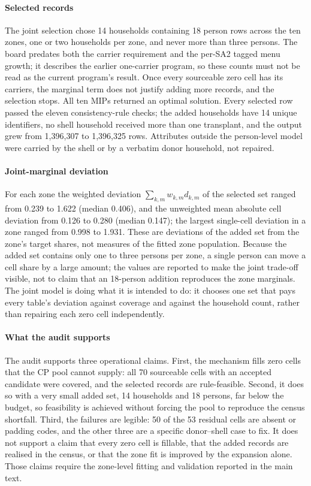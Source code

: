 \paragraph{Selected records}
The joint selection chose 14 households containing 18 person rows across the
ten zones, one or two households per zone, and never more than three persons.
The board predates both the carrier requirement and the per-SA2 tagged menu
growth; it describes the earlier one-carrier program, so these counts must not
be read as the current program's result. Once every sourceable zero cell has
its carriers, the marginal term does not justify adding more records, and the
selection stops. All ten MIPs returned an optimal solution.
Every selected row passed the eleven consistency-rule checks; the added
households have 14 unique identifiers, no shell household received more than one
transplant, and the output grew from 1{,}396{,}307 to 1{,}396{,}325 rows.
Attributes outside the person-level model were carried by the shell or by a
verbatim donor household, not repaired.

\paragraph{Joint-marginal deviation}
For each zone the weighted deviation
$\sum_{k,m}w_{k,m}d_{k,m}$ of the selected set ranged from 0.239 to 1.622
(median 0.406), and the unweighted mean absolute cell deviation from 0.126 to
0.280 (median 0.147); the largest single-cell deviation in a zone ranged from
0.998 to 1.931. These are deviations of the added set from the zone's target
shares, not measures of the fitted zone population. Because the added set
contains only one to three persons per zone, a single person can move a cell
share by a large amount; the values are reported to make the joint trade-off
visible, not to claim that an 18-person addition reproduces the zone marginals.
The joint model is doing what it is intended to do: it chooses one set that pays
every table's deviation against coverage and against the household count,
rather than repairing each zero cell independently.

\paragraph{What the audit supports}
The audit supports three operational claims. First, the mechanism fills zero
cells that the CP pool cannot supply: all 70 sourceable cells with an accepted
candidate were covered, and the selected records are rule-feasible. Second, it
does so with a very small added set, 14 households and 18 persons, far below
the budget, so feasibility is achieved without forcing the pool to reproduce
the census shortfall. Third, the failures are legible: 50 of the 53 residual
cells are absent or padding codes, and the other three are a specific
donor--shell case to fix. It does not support a claim that every zero cell is
fillable, that the added records are realised in the census, or that the zone
fit is improved by the expansion alone. Those claims require the zone-level
fitting and validation reported in the main text.

